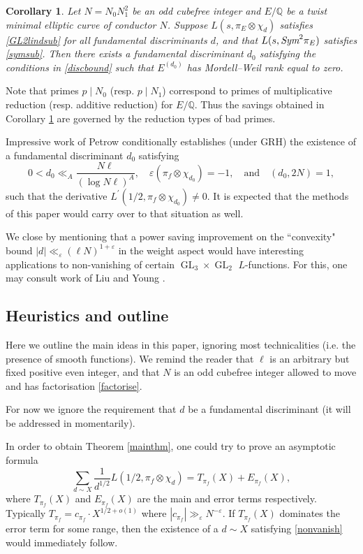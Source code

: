 \documentclass[12pt,reqno]{amsart}
\theoremstyle{plain}
\newtheorem{corollary}{Corollary}
\theoremstyle{remark}
\numberwithin{equation}{section}
\numberwithin{lemma}{section}
\numberwithin{theorem}{section}
\numberwithin{prop}{section}
\numberwithin{remark}{section}
\begin{document}
\begin{corollary} \label{elliptic}
Let $N=N_0 N_1^2$ be an odd cubefree integer and
$E/\mathbb{Q}$ be a twist minimal elliptic curve of conductor $N$.
Suppose $L(s, \pi_E \otimes \chi_d)$ satisfies \eqref{GL2lindsub} for all fundamental discriminants $d$,
and that $L(s,\emph{Sym}^2 \pi_E)$ satisfies \eqref{symsub}. 
Then there exists a fundamental
discriminant $d_0$ satisfying the conditions in \eqref{discbound}
such that $E^{(d_0)}$ has Mordell--Weil rank equal to zero.
\end{corollary}

Note that primes $p \mid N_0$ (resp. $p \mid N_1$) correspond to primes of multiplicative reduction
(resp. additive reduction) for $E/\mathbb{Q}$. Thus the savings obtained in 
Corollary \ref{elliptic} are governed  
by the reduction types of bad primes.  

Impressive work of Petrow \cite{Pet} conditionally establishes (under GRH)
 the existence of a
fundamental discriminant $d_0$
satisfying 
\begin{equation*}
 0<d_0 \ll_A \frac{N \ell}{( \log N \ell )^{A}}, \quad \varepsilon(\pi_f \otimes \chi_{d_0})=-1,
  \quad \text{and} \quad (d_0,2N)=1,
 \end{equation*}
 such that the derivative $L^{\prime}(1/2,\pi_f \otimes \chi_{d_0}) \neq 0$. It is expected
 that the methods of this paper would carry over to that situation as well.

We close by mentioning that a power saving improvement on the ``convexity" bound
 $|d| \ll_{\varepsilon} (\ell N)^{1+\varepsilon}$
in the weight aspect would have interesting applications to non-vanishing of certain 
$\operatorname{GL}_3 \times \operatorname{GL}_2$ $L$-functions. For this, 
one may consult work of Liu and Young \cite{LY}.
 
 \subsection{Heuristics and outline}  \label{sketch}
 Here we outline the main ideas in this paper, ignoring most technicalities (i.e. 
the presence of smooth functions).
We remind the reader 
that $\ell$ is an arbitrary but fixed positive even integer, and that $N$ is an odd cubefree
integer allowed to move and has factorisation \eqref{factorise}.

For now we ignore the requirement that $d$ be a fundamental discriminant 
(it will be addressed in momentarily). 

In order to obtain Theorem \ref{mainthm}, 
one could try to prove an asymptotic formula
\begin{equation} \label{heuristicmom}
\sum_{d \sim X } \frac{1}{d^{1/2}} L(1/2,\pi_f \otimes \chi_d)=T_{\pi_f}(X)+E_{\pi_f}(X),
\end{equation}
where $T_{\pi_f}(X)$ and $E_{\pi_f}(X)$ are the main and error terms 
respectively. Typically $T_{\pi_f}=c_{\pi_f} \cdot X^{1/2+o(1)}$ 
where $|c_{\pi_f}| \gg_{\varepsilon} N^{-\varepsilon}$. If 
$T_{\pi_f}(X)$ dominates the error term for some range, 
then the existence of a $d \sim  X$ satisfying \eqref{nonvanish}
would immediately follow.
 
\end{document}
